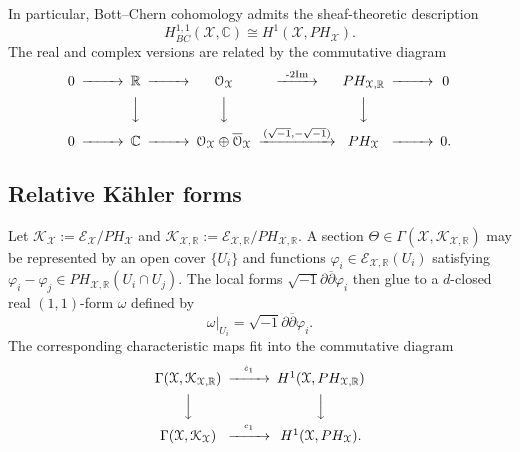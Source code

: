 \documentclass[11pt,letterpaper]{amsart}
\numberwithin{equation}{section}
\newcommand{\CC}{\mathbb{C}}
\newcommand{\RR}{\mathbb{R}}
\newcommand{\cal}{\mathcal}
\def\cE{{\cal E}}
\def\cO{{\cal O}}
\def\cX{{\cal X}}
\def\dbar{\overline{\partial}}
\def\beq{\begin{equation}}
\def\eeq{\end{equation}}
\begin{document}
In particular, Bott--Chern cohomology admits the sheaf-theoretic description
\beq\label{BC-PH}
H^{1,1}_{BC}(\cX,\CC)\cong H^1(\cX,PH_{\cX}).
\eeq
The real and complex versions are related by the commutative diagram
\beq\label{relation-1}
\begin{CD}
0@>>>  \RR @>>> \cO_{\cX}@>\text{-2Im}>>PH_{\cX,\RR}@>>>0\\
@.@VVV@VVV@VVV\\
0@>>>  \CC @>>> \cO_{\cX}\oplus\overline{\cO}_{\cX}@>(\sqrt{-1},-\sqrt{-1})>>PH_{\cX}@>>>0.
\end{CD}
\eeq


\subsection{Relative K\"ahler forms}
Let $\mathcal K_\cX:=\cE_\cX/PH_{\cX}$ and $\mathcal K_{\cX,\RR}:=\cE_{\cX,\RR}/PH_{\cX,\RR}$. A section $\Theta\in\Gamma(\cX,\mathcal K_{\cX,\RR})$ may be represented by an open cover $\{U_i\}$ and functions $\varphi_i\in\cE_{\cX,\RR}(U_i)$ satisfying $\varphi_i-\varphi_j\in PH_{\cX,\RR}(U_i\cap U_j)$. The local forms $\sqrt{-1}\partial\dbar\varphi_i$ then glue to a $d$-closed real $(1,1)$-form $\omega$ defined by
\beq
\omega|_{U_i}=\sqrt{-1}\partial\dbar\varphi_i.
\eeq
The corresponding characteristic maps fit into the commutative diagram
\beq\nonumber
\begin{CD}
\Gamma(\cX,\mathcal{K}_{\cX,\RR})@>^{\hat{c}_1}>>  H^1(\cX,PH_{\cX,\RR}) \\
@VVV@VVV\\
\Gamma(\cX,\mathcal{K}_{\cX})@>^{c_1}>>  H^1(\cX,PH_{\cX}) .
\end{CD}
\eeq
\end{document}
